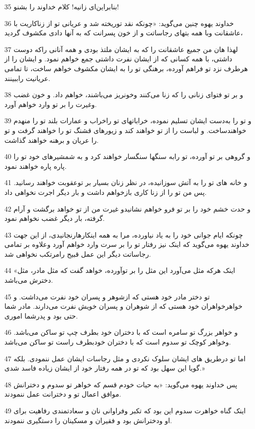\par 35 بنابراین‌ای زانیه! کلام خداوند را بشنو!
\par 36 خداوند یهوه چنین می‌گوید: «چونکه نقد توریخته شد و عریانی تو از زناکاریت با عاشقانت وبا همه بتهای رجاساتت و از خون پسرانت که به آنها دادی مکشوف گردید،
\par 37 لهذا هان من جمیع عاشقانت را که به ایشان ملتذ بودی و همه آنانی راکه دوست داشتی، با همه کسانی که از ایشان نفرت داشتی جمع خواهم نمود. و ایشان را از هرطرف نزد تو فراهم آورده، برهنگی تو را به ایشان مکشوف خواهم ساخت، تا تمامی عریانیت راببینند.
\par 38 و بر تو فتوای زنانی را که زنا می‌کنند وخونریز می‌باشند، خواهم داد. و خون غضب وغیرت را بر تو وارد خواهم آورد.
\par 39 و تو را به‌دست ایشان تسلیم نموده، خراباتهای تو راخراب و عمارات بلند تو را منهدم خواهندساخت. و لباست را از تو خواهند کند و زیورهای قشنگ تو را خواهند گرفت و تو را عریان و برهنه خواهند گذاشت.
\par 40 و گروهی بر تو آورده، تو رابه سنگها سنگسار خواهند کرد و به شمشیرهای خود تو را پاره پاره خواهند نمود.
\par 41 و خانه های تو را به آتش سوزانیده، در نظر زنان بسیار بر توعقوبت خواهند رسانید. پس من تو را از زنا کاری بازخواهم داشت و بار دیگر اجرت نخواهی داد.
\par 42 و حدت خشم خود را بر تو فرو خواهم نشانیدو غیرت من از تو خواهد برگشت و آرام گرفته، بار دیگر غضب نخواهم نمود.
\par 43 چونکه ایام جوانی خود را به یاد نیاورده، مرا به همه اینکارهارنجانیدی، از این جهت خداوند یهوه می‌گوید که اینک نیز رفتار تو را بر سرت وارد خواهم آورد وعلاوه بر تمامی رجاساتت دیگر این عمل قبیح رامرتکب نخواهی شد.
\par 44 «اینک هر‌که مثل می‌آورد این مثل را بر توآورده، خواهد گفت که مثل مادر، مثل دخترش می‌باشد.
\par 45 تو دختر مادر خود هستی که ازشوهر و پسران خود نفرت می‌داشت. و خواهرخواهران خود هستی که از شوهران و پسران خویش نفرت می‌دارند. مادر شما حتی بود و پدرشما اموری.
\par 46 و خواهر بزرگ تو سامره است که با دختران خود بطرف چپ تو ساکن می‌باشد. وخواهر کوچک تو سدوم است که با دختران خودبطرف راست تو ساکن می‌باشد.
\par 47 اما تو درطریق های ایشان سلوک نکردی و مثل رجاسات ایشان عمل ننمودی. بلکه گویا این سهل بود که تو در همه رفتار خود از ایشان زیاده فاسد شدی.»
\par 48 پس خداوند یهوه می‌گوید: «به حیات خودم قسم که خواهر تو سدوم و دخترانش موافق اعمال تو و دخترانت عمل ننمودند.
\par 49 اینک گناه خواهرت سدوم این بود که تکبر وفراوانی نان و سعادتمندی رفاهیت برای او ودخترانش بود و فقیران و مسکینان را دستگیری ننمودند.
